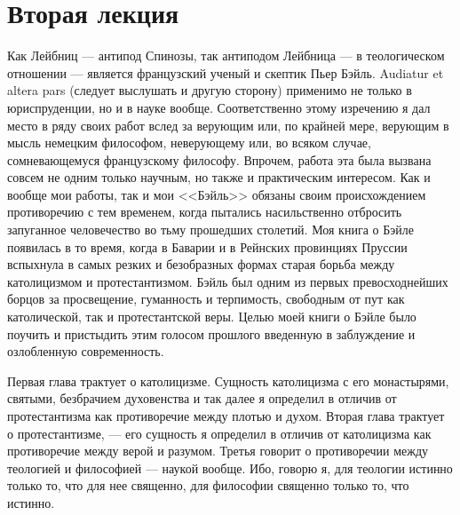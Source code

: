\documentclass[12pt]{article}
\begin{document}
\section*{Вторая лекция}

Как Лейбниц --- антипод Спинозы, так антиподом Лейбница --- в теологическом отношении --- является французский ученый и скептик Пьер Бэйль. Audiatur et altera pars (следует выслушать и другую сторону) применимо не только в юриспруденции, но и в науке вообще. Соответственно этому изречению я дал место в ряду своих работ вслед за верующим или, по крайней мере, верующим в мысль немецким философом, неверующему или, во всяком случае, сомневающемуся французскому философу. Впрочем, работа эта была вызвана совсем не одним только научным, но также и практическим интересом. Как и вообще мои работы, так и мои <<Бэйль>> обязаны своим происхождением противоречию с тем временем, когда пытались насильственно отбросить запуганное человечество во тьму прошедших столетий. Моя книга о Бэйле появилась в то время, когда в Баварии и в Рейнских провинциях Пруссии вспыхнула в самых резких и безобразных формах старая борьба между католицизмом и протестантизмом. Бэйль был одним из первых превосходнейших борцов за просвещение, гуманность и терпимость, свободным от пут как католической, так и протестантской веры. Целью моей книги о Бэйле было поучить и пристыдить этим голосом прошлого введенную в заблуждение и озлобленную современность. 

Первая глава трактует о католицизме. Сущность католицизма с его монастырями, святыми, безбрачием духовенства и так далее я определил в отличив от протестантизма как противоречие между плотью и духом. Вторая глава трактует о протестантизме, --- его сущность я определил в отличив от католицизма как противоречие между верой и разумом. Третья говорит о противоречии между теологией и философией --- наукой вообще. Ибо, говорю я, для теологии истинно только то, что для нее священно, для философии священно только то, что истинно. 
\end{document}
